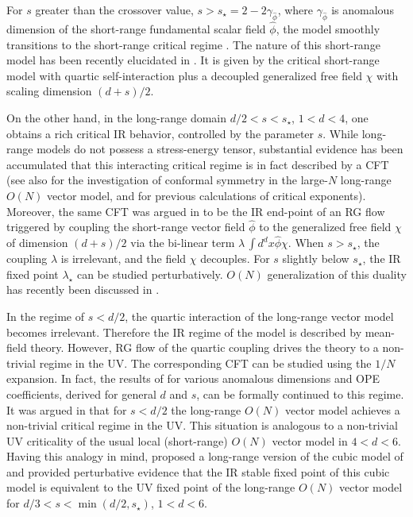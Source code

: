 \documentclass[aps,amsmath,amssymb,prd,showpacs,floatfix,preprint,superscriptaddress,nofootinbib,12pt]{article}
\begin{document}
For $s$ greater than the
crossover value, $s>s_\star = 2-2\gamma_{\hat\phi}$, where $\gamma_{\hat\phi}$
is anomalous dimension of the short-range fundamental scalar field $\hat\phi$,  the model smoothly
transitions to the short-range critical regime \cite{Sak:1973,Sak:1977}. 
The nature of this short-range model has been recently elucidated in \cite{Behan:2017dwr,Behan:2017emf}.
It is given by the critical short-range model with quartic self-interaction plus a decoupled
generalized free field $\chi$ with scaling dimension $(d+s)/2$.

On the other hand, in the long-range domain $d/2<s<s_\star$, $1<d<4$,
one obtains a rich critical IR behavior, controlled by the parameter $s$. While long-range models
do not possess a stress-energy tensor, substantial evidence has been accumulated that this interacting critical regime
is in fact described by a CFT \cite{Paulos:2015jfa,Behan:2017dwr,Behan:2017emf,Behan:2018hfx} (see also \cite{Chai:2021arp} for the
investigation of conformal symmetry in the large-$N$ long-range $O(N)$ vector model, and \cite{Brydges:2002wq,Abdesselam:2006qg,Brezin2014,Slade:2016yer,Gubser:2017vgc,Giombi:2019enr,Benedetti:2020rrq} for previous calculations of critical exponents).
Moreover, the same
CFT was argued in \cite{Behan:2017dwr,Behan:2017emf} to be the IR end-point of an RG flow triggered by coupling
the short-range vector field $\hat\phi$ to the generalized free field $\chi$ of dimension $(d+s)/2$
via the bi-linear term $\lambda\,\int d^dx \hat\phi\chi$. When $s>s_\star$,
the coupling $\lambda$ is irrelevant, and the field $\chi$ decouples. For $s$ slightly below
$s_\star$, the IR fixed point $\lambda_\star$ can be studied perturbatively. $O(N)$
generalization of this duality has recently been discussed in \cite{Chai:2021arp}.


In the regime of $s<d/2$, the quartic interaction of the long-range vector model becomes irrelevant.
Therefore the IR regime of the model is described by mean-field theory.
However, RG flow of the quartic coupling drives
the theory to a non-trivial regime in the UV. The corresponding CFT can be studied
using the $1/N$ expansion. In fact, the results of \cite{Gubser:2017vgc,Giombi:2019enr,Chai:2021arp}
for various anomalous dimensions and OPE coefficients, derived for general $d$ and $s$,
can be formally continued to this regime. It was argued in  \cite{Chakraborty:2021lwl}
that for $s<d/2$ the long-range $O(N)$
vector model achieves a non-trivial critical regime in the UV. This situation
is analogous to a non-trivial UV criticality of the usual local (short-range) $O(N)$
vector model in $4<d<6$.
Having this analogy in mind, \cite{Chakraborty:2021lwl}
proposed a long-range version of the cubic model of \cite{Fei:2014yja} and provided 
perturbative evidence that the IR stable fixed point of this cubic model is equivalent
to the UV fixed point of the long-range $O(N)$ vector model for $d/3 < s < \min (d/2, s_\star)$, $1<d<6$.\\
\end{document}
